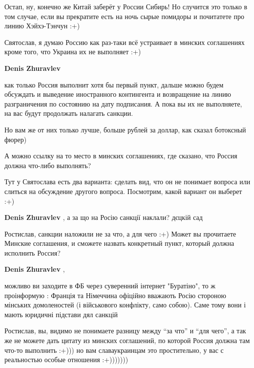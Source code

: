 \begin{itemize}
\begin{itemize}

Остап, ну, конечно же Китай заберёт у России Сибирь! Но случится это только в
том случае, если вы прекратите есть на ночь сырые помидоры и почитатете про
линию Хэйхэ-Тэнчун :+)



Святослав, я думаю Россию как раз-таки всё устраивает в минских соглашениях
кроме того, что Украина их не выполняет :+)

\textbf{Denis Zhuravlev} 

как только Россия выполнит хотя бы первый пункт, дальше можно будем обсуждать и
выведение иностранного контингента и возвращение на линию разграничения по
состоянию на дату подписания. А пока вы их не выполняете, на вас будут
продолжать налагать санкции.

Но вам же от них только лучше, больше рублей за доллар, как сказал ботоксный
фюрер)


А можно ссылку на то место в минских соглашениях, где сказано, что Россия должна что-либо выполнять?


Тут у Святослава есть два варианта: сделать вид, что он не понимает вопроса или
слиться на обсуждение другого вопроса. Посмотрим, какой вариант он выберет :+)


\textbf{Denis Zhuravlev} , а за що на Росію санкції наклали?
дєцкій сад


Ростислав, санкции наложили не за что, а для чего :+) Может вы прочитаете
Минские соглашения, и сможете назвать конкретный пункт, который должна
исполнить Россия?

\textbf{Denis Zhuravlev} , 

можливо ви заходите в ФБ через суверенний інтернет "Буратіно", то ж проінформую
: Франція та Німеччина офіційно вважають Росію стороною мінських домоленостей
(і військового конфлікту, само собою). Саме тому вони і мають юридичні підстави
дял санкцій



Ростислав, вы, видимо не понимаете разницу между \enquote{за что} и \enquote{для чего}, а так
же не можете дать цитату из минских соглашений, по которой Россия должна там
что-то выполнить :+))) но вам славаукраинцам это простительно, у вас с
реальностью особые отношения :+)))))))


\end{itemize}
\end{itemize}
